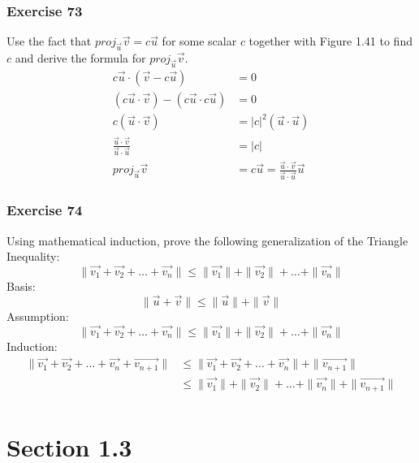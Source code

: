 \documentclass{math}
\begin{document}
\subsubsection*{Exercise 73}
Use the fact that \( proj_{\vec{u}}\vec{v} = c\vec{u} \) for some scalar \( c \)
together with Figure 1.41 to find \( c \) and derive the formula for
\( proj_{\vec{u}}\vec{v} \).
\begin{align*}
  c\vec{u}\cdot(\vec{v}-c\vec{u}) &= 0 \\
  (c\vec{u}\cdot\vec{v})-(c\vec{u}\cdot c\vec{u}) &= 0 \\
  c(\vec{u}\cdot\vec{v}) &= |c|^2(\vec{u}\cdot\vec{u}) \\
  \frac{\vec{u}\cdot\vec{v}}{\vec{u}\cdot\vec{u}} &= |c| \\
  proj_{\vec{u}}\vec{v} &= c\vec{u} =
    \frac{\vec{u}\cdot\vec{v}}{\vec{u}\cdot\vec{u}}\vec{u}
\end{align*}

\subsubsection*{Exercise 74}
Using mathematical induction, prove the following generalization of the
Triangle Inequality:
\[ \|\vec{v_1}+\vec{v_2}+\dots+\vec{v_n}\| \le
  \|\vec{v_1}\|+\|\vec{v_2}\|+\dots+\|\vec{v_n}\| \]
Basis:
\[ \|\vec{u}+\vec{v}\| \le \|\vec{u}\|+\|\vec{v}\| \]
Assumption:
\[ \|\vec{v_1}+\vec{v_2}+\dots+\vec{v_n}\| \le
  \|\vec{v_1}\|+\|\vec{v_2}\|+\dots+\|\vec{v_n}\| \]
Induction:
\begin{align*}
  \|\vec{v_1}+\vec{v_2}+\dots+\vec{v_n}+\vec{v_{n+1}}\| &\le
    \|\vec{v_1}+\vec{v_2}+\dots+\vec{v_n}\|+\|\vec{v_{n+1}}\| \\
  &\le \|\vec{v_1}\|+\|\vec{v_2}\|+\dots+\|\vec{v_n}\|+\|\vec{v_{n+1}}\| \\
\end{align*}

\section*{Section 1.3}
\end{document}
